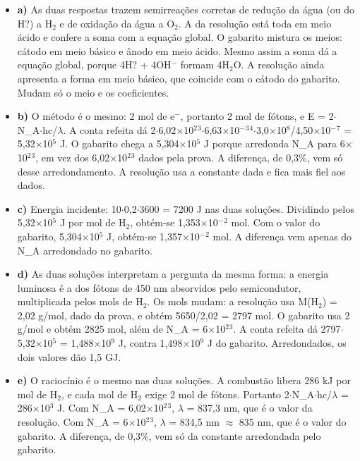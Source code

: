 \documentclass{article}%
\begin{document}
\begin{itemize}%
\item%
\textbf{a)} As duas respostas trazem semirreações corretas de redução da água (ou do H?) a H$_{2}$ e de oxidação da água a O$_{2}$. A da resolução está toda em meio ácido e confere a soma com a equação global. O gabarito mistura os meios: cátodo em meio básico e ânodo em meio ácido. Mesmo assim a soma dá a equação global, porque 4H? + 4OH$^{-}$ formam 4H$_{2}$O. A resolução ainda apresenta a forma em meio básico, que coincide com o cátodo do gabarito. Mudam só o meio e os coeficientes.%
\item%
\textbf{b)} O método é o mesmo: 2 mol de e$^{-}$, portanto 2 mol de fótons, e E = 2$\cdot$N\_A$\cdot$hc/$\lambda$. A conta refeita dá 2$\cdot$6,02$\times$10$^2$$^3$$\cdot$6,63$\times$10$^{-}$$^3$$^{4}$$\cdot$3,0$\times$10$^{8}$/4,50$\times$10$^{-}$$^{7}$ = 5,32$\times$10$^{5}$ J. O gabarito chega a 5,304$\times$10$^{5}$ J porque arredonda N\_A para 6$\times$10$^2$$^3$, em vez dos 6,02$\times$10$^2$$^3$ dados pela prova. A diferença, de 0,3\%, vem só desse arredondamento. A resolução usa a constante dada e fica mais fiel aos dados.%
\item%
\textbf{c)} Energia incidente: 10$\cdot$0,2$\cdot$3600 = 7200 J nas duas soluções. Dividindo pelos 5,32$\times$10$^{5}$ J por mol de H$_{2}$, obtém{-}se 1,353$\times$10$^{-}$$^2$ mol. Com o valor do gabarito, 5,304$\times$10$^{5}$ J, obtém{-}se 1,357$\times$10$^{-}$$^2$ mol. A diferença vem apenas do N\_A arredondado no gabarito.%
\item%
\textbf{d)} As duas soluções interpretam a pergunta da mesma forma: a energia luminosa é a dos fótons de 450 nm absorvidos pelo semicondutor, multiplicada pelos mols de H$_{2}$. Os mols mudam: a resolução usa M(H$_{2}$) = 2,02 g/mol, dado da prova, e obtém 5650/2,02 = 2797 mol. O gabarito usa 2 g/mol e obtém 2825 mol, além de N\_A = 6$\times$10$^2$$^3$. A conta refeita dá 2797$\cdot$5,32$\times$10$^{5}$ = 1,488$\times$10$^{9}$ J, contra 1,498$\times$10$^{9}$ J do gabarito. Arredondados, os dois valores dão 1,5 GJ.%
\item%
\textbf{e)} O raciocínio é o mesmo nas duas soluções. A combustão libera 286 kJ por mol de H$_{2}$, e cada mol de H$_{2}$ exige 2 mol de fótons. Portanto 2$\cdot$N\_A$\cdot$hc/$\lambda$ = 286$\times$10$^3$ J. Com N\_A = 6,02$\times$10$^2$$^3$, $\lambda$ = 837,3 nm, que é o valor da resolução. Com N\_A = 6$\times$10$^2$$^3$, $\lambda$ = 834,5 nm $\approx$ 835 nm, que é o valor do gabarito. A diferença, de 0,3\%, vem só da constante arredondada pelo gabarito.%
\end{itemize}%
\end{document}
